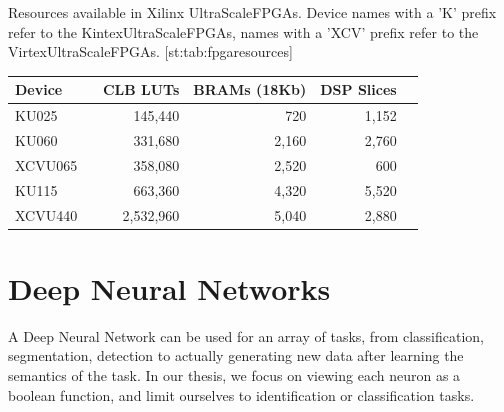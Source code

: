 \begin{table}
    \begin{sidecaption}{%
        Resources available in Xilinx  UltraScale\texttrademark FPGAs. Device names with a 'K' prefix refer to the Kintex\textregistered  UltraScale\texttrademark  FPGAs, names with a 'XCV' prefix refer to the Virtex\textregistered  UltraScale\texttrademark  FPGAs.
    }[st:tab:fpgaresources]
    \centering
    \begin{threeparttable}
    \renewcommand{\arraystretch}{1.2}
    \begin{tabular}{lrrrr}
        \toprule 
        Device                                   & CLB LUTs & BRAMs (18Kb) & DSP Slices  \\
        \midrule
        KU025 \                                  &  145,440  &  720      &     1,152   \\
        KU060\                                   &  331,680  & 2,160     &     2,760   \\
        XCVU065\                                 &  358,080  & 2,520     &     600   \\ 
        KU115\                                   &  663,360  & 4,320     &     5,520   \\ 
        XCVU440     \                            &  2,532,960& 5,040     &     2,880 \\ 
        \bottomrule
    \end{tabular}
    \end{threeparttable}
    \end{sidecaption}
\end{table}




\section{Deep Neural Networks}
A Deep Neural Network can be used for an array of tasks, from classification, segmentation, detection to actually generating new data after learning the semantics of the task. In our thesis, we focus on viewing each neuron as a boolean function, and limit ourselves to identification or classification tasks.

